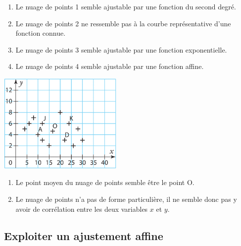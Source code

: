 \documentclass[a4paper,11pt,exos]{nsi} %
\begin{document}
\textcolor{UGLiBlue}{
    \begin{enumerate}
        \item Le nuage de points 1 semble ajustable par une fonction du second degré.
        \item Le nuage de points 2 ne ressemble pas à la courbe représentative d'une fonction connue.
        \item Le nuage de points 3 semble ajustable par une fonction exponentielle.
        \item Le nuage de points 4 semble ajustable par une fonction affine.
    \end{enumerate}
}

{\includegraphics[width=6cm]{Ex19Sesamath.png}}

\textcolor{UGLiBlue}{
    \begin{enumerate}
        \item Le point moyen du nuage de points semble être le point O.
        \item Le nuage de points n'a pas de forme particulière, il ne semble donc pas y avoir de corrélation entre les deux variables $x$ et $y$.
    \end{enumerate}
}

\subsection*{Exploiter un ajustement affine}
\end{document}
